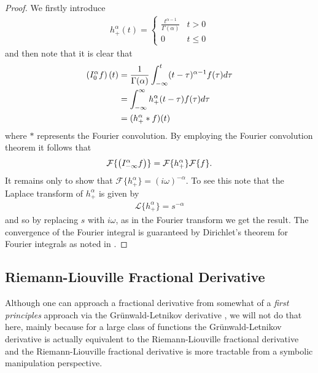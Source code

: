 \begin{proof}
    We firstly introduce
    \begin{align}
        h_+^\alpha(t) = \begin{cases}
            \frac{t^{\alpha-1}}{\Gamma(\alpha)} & t > 0 \\
            0   & t \leq 0
        \end{cases} 
    \end{align} and then note that it is clear that
    \begin{align}
        \left( I_{0}^{\alpha} f \right)(t) &= \frac{1}{\Gamma(\alpha)} \int_{-\infty}^t (t-\tau)^{\alpha-1} f(\tau)d\tau \\
            &= \int_{-\infty}^\infty h_+^\alpha(t-\tau)f(\tau)d\tau \\
            &= (h_+^\alpha * f)(t)
    \end{align}
    where $ * $ represents the Fourier convolution.
    By employing the Fourier convolution theorem it follows that
    \begin{align}
         \mathcal{F}\{ \left( I_{-\infty}^{\alpha} f \right) \} = \mathcal{F}\{ h_+^\alpha \}\mathcal{F}\{f\}.
    \end{align}
    It remains only to show that $ \mathcal{F}\{h_+^\alpha\} = (i\omega)^{-\alpha} $. To see this note that the Laplace transform of $ h_+^\alpha $ is given by
    \begin{align}
        \mathcal{L}\{h_+^\alpha\} = s^{-\alpha} 
    \end{align}
    and so by replacing $ s $ with $ i\omega $, as in the Fourier transform we get the result. The convergence of the Fourier integral is guaranteed by Dirichlet's theorem for Fourier integrals as noted in \cite{Podlubny1999}. 
\end{proof}
\subsection{Riemann-Liouville Fractional Derivative}
Although one can approach a fractional derivative from somewhat of a \emph{first principles} approach via the Gr{\"u}nwald-Letnikov derivative \cite{Podlubny1999, Samko1993}, we will not do that here, mainly because for a large class of functions the Gr{\"u}nwald-Letnikov derivative is actually equivalent to the Riemann-Liouville fractional derivative \cite{Podlubny1999} and the Riemann-Liouville fractional derivative is more tractable from a symbolic manipulation perspective.

